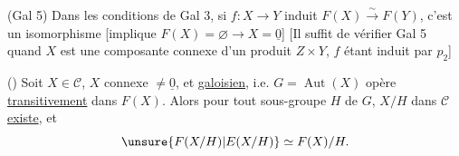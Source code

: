 
(Gal 5) Dans les conditions de Gal 3, si  $f:X\to Y$ induit $F(X)\overset{\sim}{\longrightarrow}F(Y)$, c'est un isomorphisme
[implique $F(X)=\varnothing\longrightarrow X=\underline0$]
[Il suffit de vérifier Gal 5 quand $X$ est une composante connexe d'un produit $Z\times Y$, $f$ étant induit par $p_2$]

() Soit $X\in\mathcal C$, $X$ connexe $\ne\underline0$, et \uline{galoisien},  i.e.  $G=\operatorname{Aut}(X)$ opère \uline{transitivement} dans $F(X)$.
Alors pour tout sous-groupe $H$ de $G$, $X/H$ dans $\mathcal C$ \uline{existe}, et
\[
\unsure{F(X/H)|E(X/H)}\simeq F(X)/H.
\]
